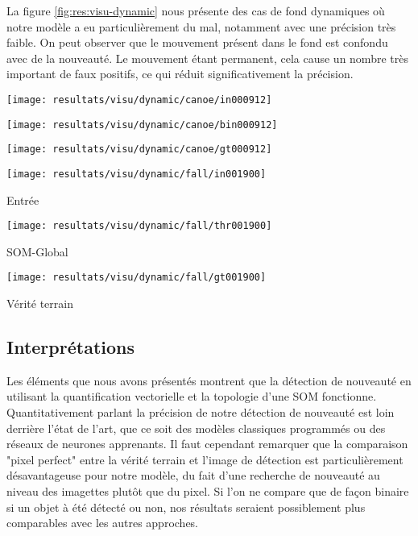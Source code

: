 	La figure \ref{fig:res:visu-dynamic} nous présente des cas de fond dynamiques où notre modèle a eu particulièrement du mal, notamment avec une précision très faible. On peut observer que le mouvement présent dans le fond est confondu avec de la nouveauté. Le mouvement étant permanent, cela cause un nombre très important de faux positifs, ce qui réduit significativement la précision.  

	\begin{figureth}
		\begin{subfigureth}{.32\textwidth}
			\texttt{[image: resultats/visu/dynamic/canoe/in000912]}
		\end{subfigureth}
		\begin{subfigureth}{.32\textwidth}
			\texttt{[image: resultats/visu/dynamic/canoe/bin000912]}
		\end{subfigureth}
		\begin{subfigureth}{.32\textwidth}
			\texttt{[image: resultats/visu/dynamic/canoe/gt000912]}
		\end{subfigureth}

		\begin{subfigureth}{.32\textwidth}
			\texttt{[image: resultats/visu/dynamic/fall/in001900]} \caption{Entrée}
		\end{subfigureth}
		\begin{subfigureth}{.32\textwidth}
			\texttt{[image: resultats/visu/dynamic/fall/thr001900]} \caption{SOM-Global}
		\end{subfigureth}
		\begin{subfigureth}{.32\textwidth}
			\texttt{[image: resultats/visu/dynamic/fall/gt001900]} \caption{Vérité terrain}
		\end{subfigureth}

		\caption[]{}\label{fig:res:visu-dynamic}
	\end{figureth}

	\subsection{Interprétations}

	Les éléments que nous avons présentés montrent que la détection de nouveauté en utilisant la quantification vectorielle et la topologie d'une SOM fonctionne. Quantitativement parlant la précision de notre détection de nouveauté est loin derrière l'état de l'art, que ce soit des modèles classiques programmés ou des réseaux de neurones apprenants. Il faut cependant remarquer que la comparaison "pixel perfect" entre la vérité terrain et l'image de détection est particulièrement désavantageuse pour notre modèle, du fait d'une recherche de nouveauté au niveau des imagettes plutôt que du pixel. Si l'on ne compare que de façon binaire si un objet à été détecté ou non, nos résultats seraient possiblement plus comparables avec les autres approches.
	
